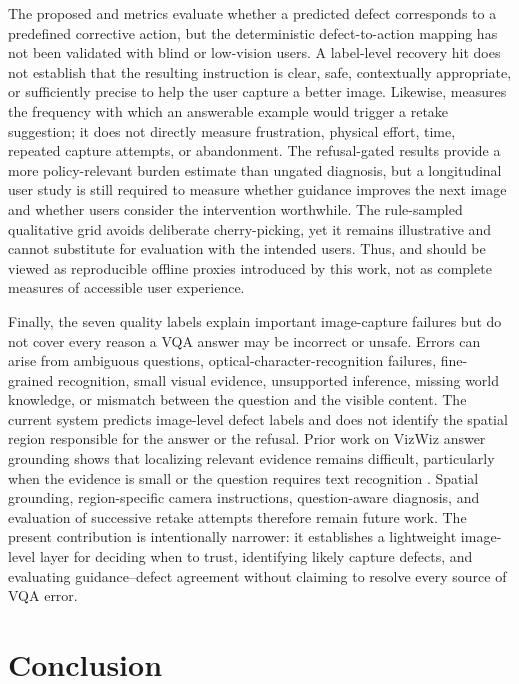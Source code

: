 \documentclass{ieeeaccess}
\newcommand{\arr}{\mathrm{GDMR}}
\newcommand{\frr}{\mathrm{AIRB}}
\begin{document}
The proposed \arr{} and \frr{} metrics evaluate whether a
predicted defect corresponds to a predefined corrective action,
but the deterministic defect-to-action mapping has not been
validated with blind or low-vision users. A label-level recovery
hit does not establish that the resulting instruction is clear,
safe, contextually appropriate, or sufficiently precise to help the
user capture a better image. Likewise, \frr{} measures the
frequency with which an answerable example would trigger a
retake suggestion; it does not directly measure frustration,
physical effort, time, repeated capture attempts, or abandonment.
The refusal-gated results provide a more policy-relevant
burden estimate than ungated diagnosis, but a longitudinal user
study is still required to measure whether guidance improves the
next image and whether users consider the intervention worthwhile.
The rule-sampled qualitative grid avoids deliberate cherry-picking,
yet it remains illustrative and cannot substitute for evaluation
with the intended users. Thus, \arr{} and \frr{} should be viewed
as reproducible offline proxies introduced by this work, not as
complete measures of accessible user experience.

Finally, the seven quality labels explain important image-capture
failures but do not cover every reason a VQA answer may be
incorrect or unsafe. Errors can arise from ambiguous questions,
optical-character-recognition failures, fine-grained recognition,
small visual evidence, unsupported inference, missing world
knowledge, or mismatch between the question and the visible
content. The current system predicts image-level defect labels and
does not identify the spatial region responsible for the answer or
the refusal. Prior work on VizWiz answer grounding shows that
localizing relevant evidence remains difficult, particularly when
the evidence is small or the question requires text recognition
\cite{chen2022grounding}. Spatial grounding, region-specific
camera instructions, question-aware diagnosis, and evaluation of
successive retake attempts therefore remain future work. The
present contribution is intentionally narrower: it establishes a
lightweight image-level layer for deciding when to trust, identifying
likely capture defects, and evaluating guidance--defect agreement without
claiming to resolve every source of VQA error.

\section{Conclusion} \label{sec:conclusion}
\end{document}
